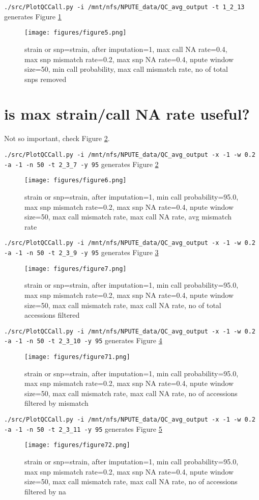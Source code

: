 \documentclass[a4paper,10pt]{article}
\begin{document}
\verb+./src/PlotQCCall.py -i /mnt/nfs/NPUTE_data/QC_avg_output -t 1_2_13+ generates Figure \ref{f5}
\begin{figure}
\texttt{[image: figures/figure5.png]}
\caption{strain or snp=strain, after imputation=1, max call NA rate=0.4, max snp mismatch rate=0.2, max snp NA rate=0.4, npute window size=50, min call probability, max call mismatch rate, no of total snps removed}\label{f5}
\end{figure}

\section{is max strain/call NA rate useful?}
Not so important, check Figure \ref{f6}.

\verb+./src/PlotQCCall.py -i /mnt/nfs/NPUTE_data/QC_avg_output -x -1 -w 0.2 -a -1 -n 50 -t 2_3_7 -y 95+ generates Figure \ref{f6}
\begin{figure}
\texttt{[image: figures/figure6.png]}
\caption{strain or snp=strain, after imputation=1, min call probability=95.0, max snp mismatch rate=0.2, max snp NA rate=0.4, npute window size=50, max call mismatch rate, max call NA rate, avg mismatch rate}\label{f6}
\end{figure}

\verb+./src/PlotQCCall.py -i /mnt/nfs/NPUTE_data/QC_avg_output -x -1 -w 0.2 -a -1 -n 50 -t 2_3_9 -y 95+ generates Figure \ref{f7}
\begin{figure}
\texttt{[image: figures/figure7.png]}
\caption{strain or snp=strain, after imputation=1, min call probability=95.0, max snp mismatch rate=0.2, max snp NA rate=0.4, npute window size=50, max call mismatch rate, max call NA rate, no of total accessions filtered}\label{f7}
\end{figure}

\verb+./src/PlotQCCall.py -i /mnt/nfs/NPUTE_data/QC_avg_output -x -1 -w 0.2 -a -1 -n 50 -t 2_3_10 -y 95+ generates Figure \ref{f71}
\begin{figure}
\texttt{[image: figures/figure71.png]}
\caption{strain or snp=strain, after imputation=1, min call probability=95.0, max snp mismatch rate=0.2, max snp NA rate=0.4, npute window size=50, max call mismatch rate, max call NA rate, no of accessions filtered by mismatch}\label{f71}
\end{figure}

\verb+./src/PlotQCCall.py -i /mnt/nfs/NPUTE_data/QC_avg_output -x -1 -w 0.2 -a -1 -n 50 -t 2_3_11 -y 95+ generates Figure \ref{f72}
\begin{figure}
\texttt{[image: figures/figure72.png]}
\caption{strain or snp=strain, after imputation=1, min call probability=95.0, max snp mismatch rate=0.2, max snp NA rate=0.4, npute window size=50, max call mismatch rate, max call NA rate, no of accessions filtered by na}\label{f72}
\end{figure}
\end{document}
